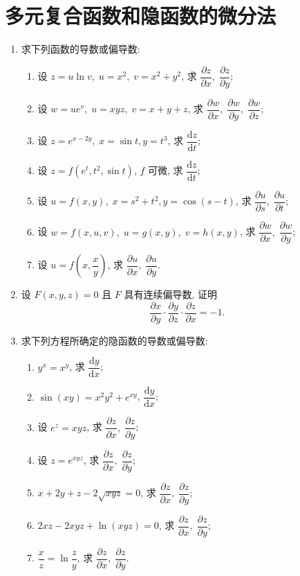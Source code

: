 \section{多元复合函数和隐函数的微分法}

\begin{enumerate}\setlength{\itemsep}{7pt}
    \item 求下列函数的导数或偏导数:
    \begin{enumerate}[(1)]\setlength{\itemsep}{5pt}\setlength{\topsep}{15pt}
        \item 设 $z=u\ln v,\;u=x^2,\;v=x^2+y^2$, 求 $\dfrac{\partial z}{\partial x},\;\dfrac{\partial z}{\partial y}$;
        \item 设 $w=ue^{v},\;u=xyz,\;v=x+y+z$, 求 $\dfrac{\partial w}{\partial x},\;\dfrac{\partial w}{\partial y},\;\dfrac{\partial w}{\partial z}$;
        \item 设 $z=e^{x-2y},\;x=\sin t, y=t^3$, 求 $\dfrac{\text{d}z}{\text{d}t}$;
        \item 设 $z=f(e^t, t^2, \sin t)$, $f$ 可微, 求 $\dfrac{\text{d}z}{\text{d}t}$;
        \item 设 $u=f(x, y),\;x=s^2+t^2, y=\cos(s-t)$, 求 $\dfrac{\partial u}{\partial s},\;\dfrac{\partial u}{\partial t}$;
        \item 设 $w=f(x, u, v),\;u=g(x, y),\;v=h(x, y)$, 求 $\dfrac{\partial w}{\partial x},\;\dfrac{\partial w}{\partial y}$;
        \item 设 $u=f\left(x,\dfrac{x}{y}\right)$, 求 $\dfrac{\partial u}{\partial x},\;\dfrac{\partial u}{\partial y}$.
    \end{enumerate}
    
    \item 设 $F(x, y, z)=0$ 且 $F$ 具有连续偏导数, 证明
    \[
        \dfrac{\partial x}{\partial y}\cdot\dfrac{\partial y}{\partial z}\cdot\dfrac{\partial z}{\partial x}=-1.
    \]

    \item 求下列方程所确定的隐函数的导数或偏导数:
    \begin{enumerate}[(1)]\setlength{\itemsep}{5pt}\setlength{\topsep}{15pt}
        \item $y^x=x^y$, 求 $\dfrac{\text{d}y}{\text{d}x}$;
        \item $\sin(xy)=x^2y^2+e^{xy}$, $\dfrac{\text{d}y}{\text{d}x}$;
        \item 设 $e^{z}=xyz$, 求 $\dfrac{\partial z}{\partial x},\;\dfrac{\partial z}{\partial y}$;
        \item 设 $z=e^{xyz}$, 求 $\dfrac{\partial z}{\partial x},\;\dfrac{\partial z}{\partial y}$;
        \item $x+2y+z-2\sqrt{xyz}=0$, 求 $\dfrac{\partial z}{\partial x},\;\dfrac{\partial z}{\partial y}$;
        \item $2xz-2xyz+\ln(xyz)=0$, 求 $\dfrac{\partial z}{\partial x},\;\dfrac{\partial z}{\partial y}$;
        \item $\dfrac{x}{z}=\ln\dfrac{z}{y}$, 求 $\dfrac{\partial z}{\partial x},\;\dfrac{\partial z}{\partial y}$.
    \end{enumerate}


\end{enumerate}
